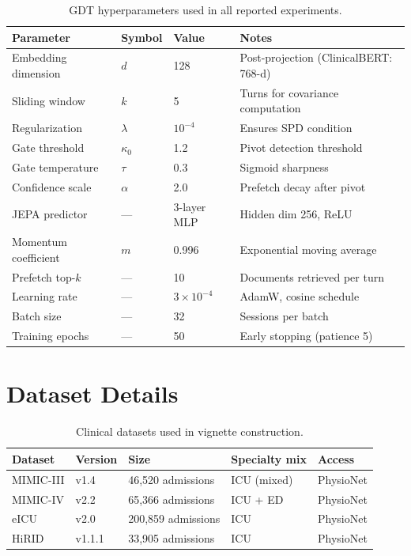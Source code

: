 \documentclass[11pt]{article}
\begin{document}
\begin{table}[h]
\centering
\caption{GDT hyperparameters used in all reported experiments.}
\label{tab:hyperparams}
\begin{tabular}{llll}
\toprule
\textbf{Parameter} & \textbf{Symbol} & \textbf{Value} & \textbf{Notes} \\
\midrule
Embedding dimension    & $d$       & 128    & Post-projection (ClinicalBERT: 768-d) \\
Sliding window         & $k$       & 5      & Turns for covariance computation \\
Regularization         & $\lambda$ & $10^{-4}$ & Ensures SPD condition \\
Gate threshold         & $\kappa_0$& 1.2    & Pivot detection threshold \\
Gate temperature       & $\tau$    & 0.3    & Sigmoid sharpness \\
Confidence scale       & $\alpha$  & 2.0    & Prefetch decay after pivot \\
JEPA predictor         & ---       & 3-layer MLP & Hidden dim 256, ReLU \\
Momentum coefficient   & $m$       & 0.996  & Exponential moving average \\
Prefetch top-$k$       & ---       & 10     & Documents retrieved per turn \\
Learning rate          & ---       & $3\times10^{-4}$ & AdamW, cosine schedule \\
Batch size             & ---       & 32     & Sessions per batch \\
Training epochs        & ---       & 50     & Early stopping (patience 5) \\
\bottomrule
\end{tabular}
\end{table}

\section{Dataset Details}
\label{sec:datasets}

\begin{table}[h]
\centering
\caption{Clinical datasets used in vignette construction.}
\label{tab:datasets}
\begin{tabular}{lllll}
\toprule
\textbf{Dataset} & \textbf{Version} & \textbf{Size} & \textbf{Specialty mix} & \textbf{Access} \\
\midrule
MIMIC-III & v1.4  & 46,520 admissions & ICU (mixed) & PhysioNet \\
MIMIC-IV  & v2.2  & 65,366 admissions & ICU + ED    & PhysioNet \\
eICU      & v2.0  & 200,859 admissions & ICU        & PhysioNet \\
HiRID     & v1.1.1& 33,905 admissions & ICU        & PhysioNet \\
\bottomrule
\end{tabular}
\end{table}
\end{document}

